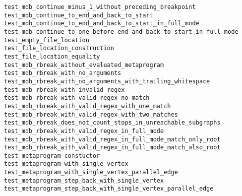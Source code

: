 \begin{description}
    \item[\texttt{test\_mdb\_continue\_minus\_1\_without\_preceding\_breakpoint}]
    \item[\texttt{test\_mdb\_continue\_to\_end\_and\_back\_to\_start}]
    \item[\texttt{test\_mdb\_continue\_to\_end\_and\_back\_to\_start\_in\_full\_mode}]
    \item[\texttt{test\_mdb\_continue\_to\_one\_before\_end\_and\_back\_to\_start\_in\_full\_mode}]
    \item[\texttt{test\_empty\_file\_location}]
    \item[\texttt{test\_file\_location\_construction}]
    \item[\texttt{test\_file\_location\_equality}]
    \item[\texttt{test\_mdb\_rbreak\_without\_evaluated\_metaprogram}]
    \item[\texttt{test\_mdb\_rbreak\_with\_no\_arguments}]
    \item[\texttt{test\_mdb\_rbreak\_with\_no\_arguments\_with\_trailing\_whitespace}]
    \item[\texttt{test\_mdb\_rbreak\_with\_invalid\_regex}]
    \item[\texttt{test\_mdb\_rbreak\_with\_valid\_regex\_no\_match}]
    \item[\texttt{test\_mdb\_rbreak\_with\_valid\_regex\_with\_one\_match}]
    \item[\texttt{test\_mdb\_rbreak\_with\_valid\_regex\_with\_two\_matches}]
    \item[\texttt{test\_mdb\_rbreak\_does\_not\_count\_stops\_in\_unreachable\_subgraphs}]
    \item[\texttt{test\_mdb\_rbreak\_with\_valid\_regex\_in\_full\_mode}]
    \item[\texttt{test\_mdb\_rbreak\_with\_valid\_regex\_in\_full\_mode\_match\_only\_root}]
    \item[\texttt{test\_mdb\_rbreak\_with\_valid\_regex\_in\_full\_mode\_match\_also\_root}]
    \item[\texttt{test\_metaprogram\_constuctor}]
    \item[\texttt{test\_metaprogram\_with\_single\_vertex}]
    \item[\texttt{test\_metaprogram\_with\_single\_vertex\_parallel\_edge}]
    \item[\texttt{test\_metaprogram\_step\_back\_with\_single\_vertex}]
    \item[\texttt{test\_metaprogram\_step\_back\_with\_single\_vertex\_parallel\_edge}]

\end{description}
